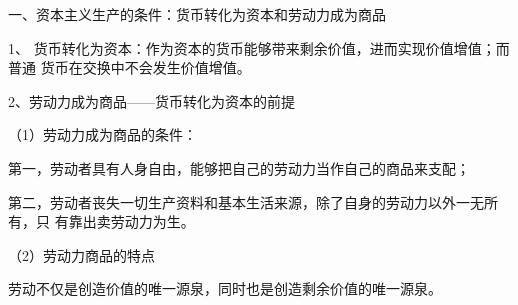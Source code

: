 一、资本主义生产的条件：货币转化为资本和劳动力成为商品

1、
货币转化为资本：作为资本的货币能够带来剩余价值，进而实现价值增值；而普通
货币在交换中不会发生价值增值。

2、劳动力成为商品------货币转化为资本的前提

（1）劳动力成为商品的条件：

第一，劳动者具有人身自由，能够把自己的劳动力当作自己的商品来支配；

第二，劳动者丧失一切生产资料和基本生活来源，除了自身的劳动力以外一无所有，只
有靠出卖劳动力为生。

（2）劳动力商品的特点

劳动不仅是创造价值的唯一源泉，同时也是创造剩余价值的唯一源泉。
